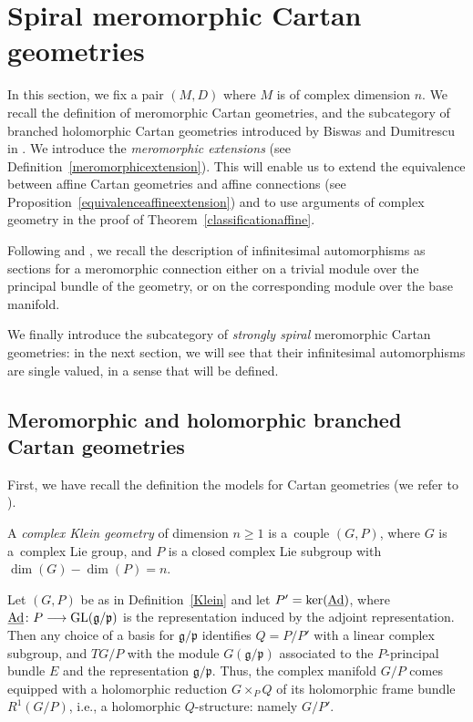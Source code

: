 \documentclass[10pt,a4paper]{amsart}
\numberwithin{equation}{section}
\begin{document}
\section{Spiral meromorphic Cartan geometries}\label{section2}
In this section, we fix a pair $(M,D)$ where $M$ is of complex dimension $n$. We recall the definition of meromorphic Cartan geometries, and the subcategory of branched holomorphic Cartan geometries introduced by Biswas and Dumitrescu in \cite{BD}.
We introduce the \textit{meromorphic extensions} (see Definition~\ref{meromorphicextension}). This will enable us to extend the equivalence between affine Cartan geometries and affine connections (see Proposition~\ref{equivalenceaffineextension}) and to use arguments of complex geometry in the proof of Theorem~\ref{classificationaffine}.

Following \cite{BlazquezCasale} and \cite{Cap4}, we recall the description of infinitesimal automorphisms as sections for a meromorphic connection either on a trivial module over the principal bundle of the geometry, or on the corresponding module over the base manifold.

We finally introduce the subcategory of \textit{strongly spiral} meromorphic Cartan geometries: in the next section, we will see that their infinitesimal automorphisms are single valued, in a sense that will be defined.

\subsection{Meromorphic and holomorphic branched Cartan geometries}
First, we have recall the definition the models for Cartan geometries (we refer to \cite[Chapter~4]{Sharpe}).
\begin{Definition}\label{Klein} A \textit{complex Klein geometry} of dimension $n\geq 1$ is a~couple $(G,P)$, where $G$ is a~complex Lie group, and $P$ is a closed complex Lie subgroup with $\dim(G)-\dim(P)=n$. \end{Definition}
Let $(G,P)$ be as in Definition~\ref{Klein} and let $P'=\ker(\underline{{\rm Ad}})$, where $\underline{{\rm Ad}}\colon P \longrightarrow {\rm GL}(\mathfrak{g}/\mathfrak{p})$ is the representation induced by the adjoint representation. Then any choice of a basis for $\mathfrak{g}/\mathfrak{p}$ identifies $Q=P/P'$ with a linear complex subgroup, and $TG/P$ with the module $G(\mathfrak{g}/\mathfrak{p})$ associated to the $P$-principal bundle $E$ and the representation $\mathfrak{g}/\mathfrak{p}$. Thus, the complex manifold $G/P$ comes equipped with a holomorphic reduction $G\times_{P} Q$ of its holomorphic frame bundle $R^1(G/P)$, i.e., a holomorphic $Q$-structure: namely $G/P'$.
\end{document}
